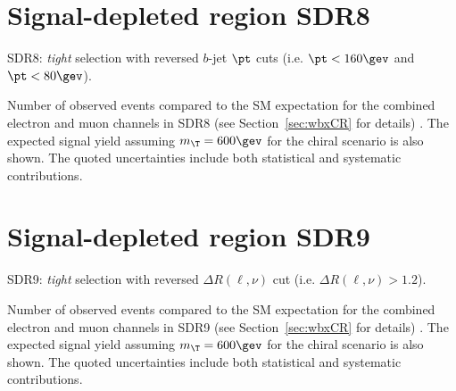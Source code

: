 %


\clearpage

\section{Signal-depleted region SDR8}
\label{sec:DataMC_CR8}

SDR8: {\sl tight} selection with reversed $b$-jet $\pt$ cuts (i.e. $\pt < 160\gev$ and $\pt < 80\gev$).

\begin{table}[h!]
\begin{center}

\caption{\small{Number of observed events compared to the SM expectation for
the combined electron and muon channels in SDR8 (see Section~\ref{sec:wbxCR} for details) . 
The expected signal yield assuming $m_{\T}=600\gev$ for the chiral scenario is also shown. 
The quoted uncertainties include both statistical and systematic contributions.}}
\label{tab:CR8_1W_evtable}
\end{center}
\end{table}

\clearpage

%


\clearpage

\section{Signal-depleted region SDR9}
\label{sec:DataMC_CR9}

SDR9: {\sl tight} selection with reversed $\Delta R(\ell,\nu)$ cut (i.e. $\Delta R(\ell,\nu)>1.2$).

\begin{table}[h!]
\begin{center}

\caption{\small{Number of observed events compared to the SM expectation for
the combined electron and muon channels in SDR9 (see Section~\ref{sec:wbxCR} for details) . 
The expected signal yield assuming $m_{\T}=600\gev$ for the chiral scenario is also shown. 
The quoted uncertainties include both statistical and systematic contributions.}}
\label{tab:CR9_1W_evtable}
\end{center}
\end{table}

\clearpage

%

